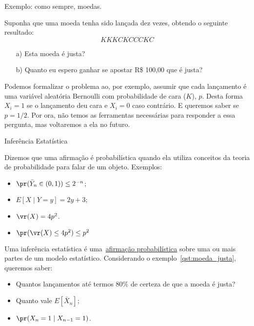 \begin{frame}{Exemplo: como sempre, moedas.}
 \begin{pergunta}
 \label{qst:moeda_justa}
  Suponha que uma moeda tenha sido lançada dez vezes, obtendo o seguinte resultado:
  \begin{equation*}
   KKKCKCCCKC
  \end{equation*}
\begin{itemize}
 \item[a)] Esta moeda é justa?
 \item[b)] Quanto eu espero ganhar se apostar R\$ 100,00 que é justa? 
\end{itemize}
 \end{pergunta}
 Podemos formalizar o problema ao, por exemplo, assumir que cada lançamento é uma variável aleatória Bernoulli com probabilidade de cara ($K$), $p$.
 Desta forma $X_i = 1$ se o lançamento deu cara e $X_i = 0$ caso contrário.
 E queremos saber se $p = 1/2$.
 Por ora, não temos as ferramentas necessárias para responder a essa pergunta, mas voltaremos a ela no futuro.
\end{frame}
\begin{frame}{Inferência Estatística}
\begin{defn}
\label{def:probabilistic_assertion}
 Dizemos que uma afirmação é probabilística quando ela utiliza conceitos da teoria de probabilidade para falar de um objeto.
 Exemplos: 
 \begin{itemize}
  \item $\pr( \bar{Y}_n \in (0, 1)) \leq 2^{-n}$;
  \item $E[X \mid Y = y] = 2y + 3$;
  \item $\vr(X) = 4p^2$.
  \item $\pr(\vr(X) \leq 4p^2 ) \leq p^2$
 \end{itemize}
\end{defn}
\begin{defn}
\label{def:statistical_inference}
 Uma inferência estatística é uma~\underline{afirmação probabilística} sobre uma ou mais partes de um modelo estatístico.
 Considerando o exemplo~\ref{qst:moeda_justa}, queremos saber:
 \begin{itemize}
  \item Quantos lançamentos até termos $80\%$ de certeza de que a moeda é justa?
  \item Quanto vale $E[\bar{X}_n]$;
  \item $\pr(X_{n} = 1 \mid X_{n-1} = 1)$. 
 \end{itemize}
\end{defn}
\end{frame}
